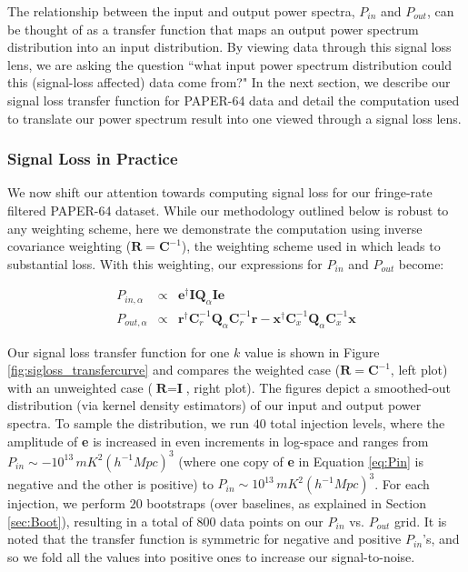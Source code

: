 \documentclass[preprint2,numberedappendix,tighten]{aastex6}  %
\begin{document}
The relationship between the input and output power spectra, $P_{in}$ and $P_{out}$, can be thought of as a transfer function that maps an output power spectrum distribution into an input distribution. By viewing data through this signal loss lens, we are asking the question ``what input power spectrum distribution could this (signal-loss affected) data come from?" In the next section, we describe our signal loss transfer function for PAPER-64 data and detail the computation used to translate our power spectrum result into one viewed through a signal loss lens.

\subsubsection{Signal Loss in Practice}

We now shift our attention towards computing signal loss for our fringe-rate filtered PAPER-64 dataset. While our methodology outlined below is robust to any weighting scheme, here we demonstrate the computation using inverse covariance weighting ($\textbf{R} = \textbf{C}^{-1}$), the weighting scheme used in \citet{ali_et_al2015} which leads to substantial loss. With this weighting, our expressions for $P_{in}$ and $P_{out}$ become:

\begin{eqnarray}
P_{in,\alpha} &\propto& \textbf{e}^{\dagger}\textbf{I}\textbf{Q}_{\alpha}\textbf{I}\textbf{e} \\
P_{out,\alpha} &\propto& \textbf{r}^{\dagger}\textbf{C}_{r}^{-1}\textbf{Q}_{\alpha}\textbf{C}_{r}^{-1}\textbf{r} - \textbf{x}^{\dagger}\textbf{C}_{x}^{-1}\textbf{Q}_{\alpha}\textbf{C}_{x}^{-1}\textbf{x} 
\end{eqnarray}

Our signal loss transfer function for one $k$ value is shown in Figure \ref{fig:sigloss_transfercurve} and compares the weighted case ($\textbf{R} = \textbf{C}^{-1}$, left plot) with an unweighted case ($\textbf{R} = \textbf{I}$, right plot). The figures depict a smoothed-out distribution (via kernel density estimators) of our input and output power spectra. To sample the distribution, we run $40$ total injection levels, where the amplitude of \textbf{e} is increased in even increments in log-space and ranges from $P_{in} \sim -10^{13} \, mK^{2} (h^{-1} Mpc)^{3}$ (where one copy of \textbf{e} in Equation \ref{eq:Pin} is negative and the other is positive) to $P_{in} \sim10^{13} \, mK^{2} (h^{-1} Mpc)^{3}$. For each injection, we perform $20$ bootstraps (over baselines, as explained in Section \ref{sec:Boot}), resulting in a total of $800$ data points on our $P_{in}$ vs. $P_{out}$ grid. It is noted that the transfer function is symmetric for negative and positive $P_{in}$'s, and so we fold all the values into positive ones to increase our signal-to-noise.
\end{document}
